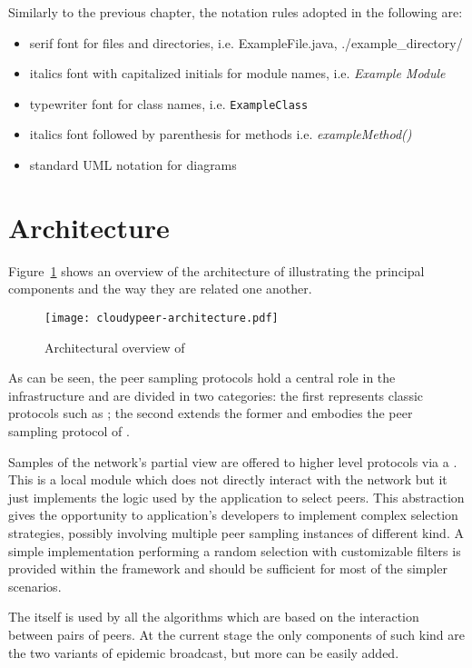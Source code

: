 Similarly to the previous chapter, the notation rules adopted in the
following are:
\begin{itemize}
  \item serif font for files and directories, i.e. \textsf{ExampleFile.java},
    \textsf{./example\_directory/}
  \item italics font with capitalized initials for module names,
    i.e. \textit{Example Module}
 \item typewriter font for class names, i.e. \texttt{ExampleClass}
  \item italics font followed by parenthesis for methods
    i.e. \textit{exampleMethod()}
  \item standard UML notation for diagrams
\end{itemize}

\section{Architecture}
Figure~\ref{fig:cloudypeer-architecture} shows an overview of the
architecture of \cloudypeer illustrating the principal components and
the way they are related one another.

\begin{figure}[h!]
  \centering
  \texttt{[image: cloudypeer-architecture.pdf]}
  \caption{Architectural overview of \cloudypeer}
  \label{fig:cloudypeer-architecture}
\end{figure}

As can be seen, the peer sampling protocols hold a central role in the
infrastructure and are divided in two categories: the first represents
classic protocols such as \cyclon; the second extends the former and
embodies the peer sampling protocol of \cloudcast.

Samples of the network's partial view are offered to higher level
protocols via a \peerselector. This is a local module which does not
directly interact with the \ptop network but it just implements the logic
used by the application to select peers. This abstraction gives the
opportunity to application's developers to implement complex selection
strategies, possibly involving multiple peer sampling instances of
different kind. A simple implementation performing a random
selection with customizable filters is provided within the framework
and should be sufficient for most of the simpler scenarios.

The \peerselector itself is used by all the algorithms which are
based on the interaction between pairs of peers. At the current stage
the only components of such kind are the two variants of epidemic
broadcast, but more can be easily added.

